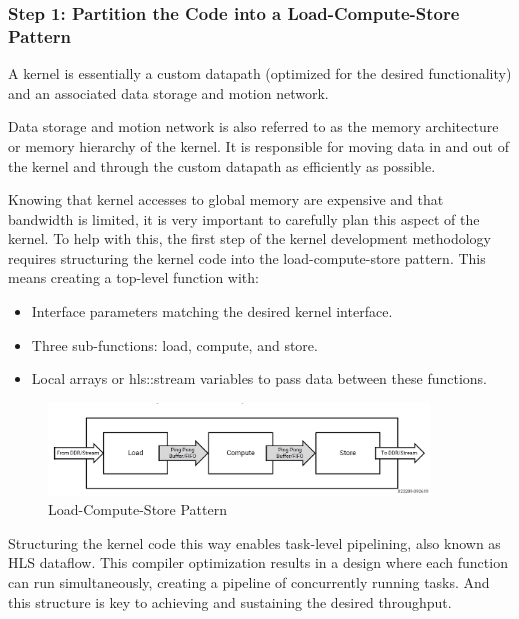 \subsubsection{Step 1: Partition the Code into a Load-Compute-Store
Pattern}

\begin{highlight}
    A kernel is essentially a custom datapath (optimized for the desired functionality) and an associated data storage and motion network. 
\end{highlight}

Data storage and motion network is also referred to as the memory architecture or memory hierarchy of the kernel. It is responsible for moving data in and out of the kernel and through the custom datapath as efficiently as possible.

\par Knowing that kernel accesses to global memory are expensive and that bandwidth is limited, it is very important to carefully plan this aspect of the kernel. To help with this, the first step of the kernel development methodology requires structuring the kernel code into the load-compute-store pattern. This means creating a top-level function with:

\begin{itemize}
    \item Interface parameters matching the desired kernel interface.
    \item Three sub-functions: load, compute, and store.
    \item Local arrays or hls::stream variables to pass data between these functions.
\end{itemize}

\begin{figure}[H]
    \begin{center}
        \includegraphics[width=0.9\textwidth]{images/LCSPattern.PNG}
        \caption{Load-Compute-Store Pattern}
        \label{LCSPattern}
    \end{center}
\end{figure}

Structuring the kernel code this way enables task-level pipelining, also known as HLS dataflow. This compiler optimization results in a design where each function can run simultaneously, creating a pipeline of concurrently running tasks. And this structure is key to achieving and sustaining the desired throughput. 

